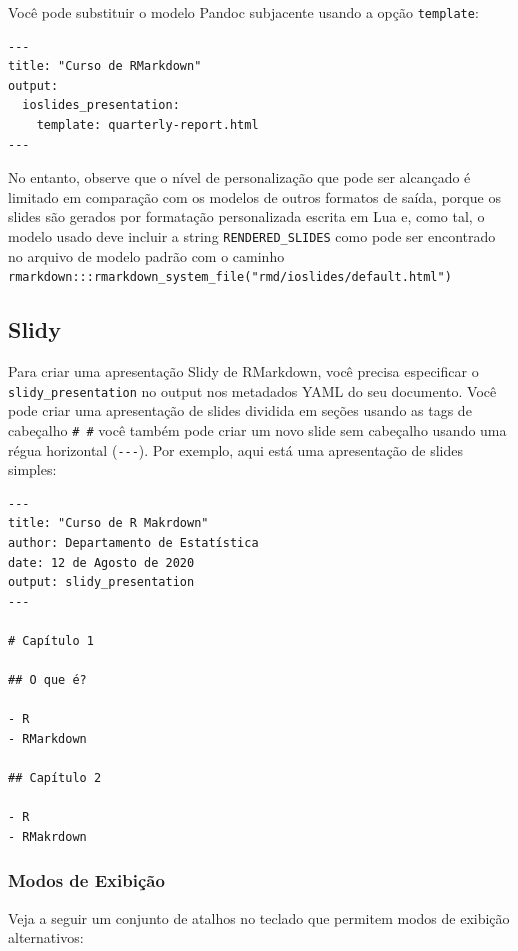 \documentclass[
]{book}
\begin{document}
Você pode substituir o modelo Pandoc subjacente usando a opção \texttt{template}:

\begin{verbatim}
---
title: "Curso de RMarkdown"
output:
  ioslides_presentation:
    template: quarterly-report.html
---
\end{verbatim}

No entanto, observe que o nível de personalização que pode ser alcançado é limitado em comparação com os modelos de outros formatos de saída, porque os slides são gerados por formatação personalizada escrita em Lua e, como tal, o modelo usado deve incluir a string \texttt{RENDERED\_SLIDES} como pode ser encontrado no arquivo de modelo padrão com o caminho \texttt{rmarkdown:::rmarkdown\_system\_file("rmd/ioslides/default.html")}

\hypertarget{slidy}{%
\subsection{Slidy}\label{slidy}}

Para criar uma apresentação Slidy de RMarkdown, você precisa especificar o \texttt{slidy\_presentation} no output nos metadados YAML do seu documento. Você pode criar uma apresentação de slides dividida em seções usando as tags de cabeçalho \texttt{\#\ \#} você também pode criar um novo slide sem cabeçalho usando uma régua horizontal (\texttt{-\/-\/-}). Por exemplo, aqui está uma apresentação de slides simples:

\begin{verbatim}
---
title: "Curso de R Makrdown"
author: Departamento de Estatística
date: 12 de Agosto de 2020
output: slidy_presentation
---

# Capítulo 1

## O que é?

- R
- RMarkdown

## Capítulo 2

- R
- RMakrdown
\end{verbatim}

\hypertarget{modos-de-exibiuxe7uxe3o}{%
\subsubsection*{Modos de Exibição}\label{modos-de-exibiuxe7uxe3o}}

Veja a seguir um conjunto de atalhos no teclado que permitem modos de exibição alternativos:
\end{document}
